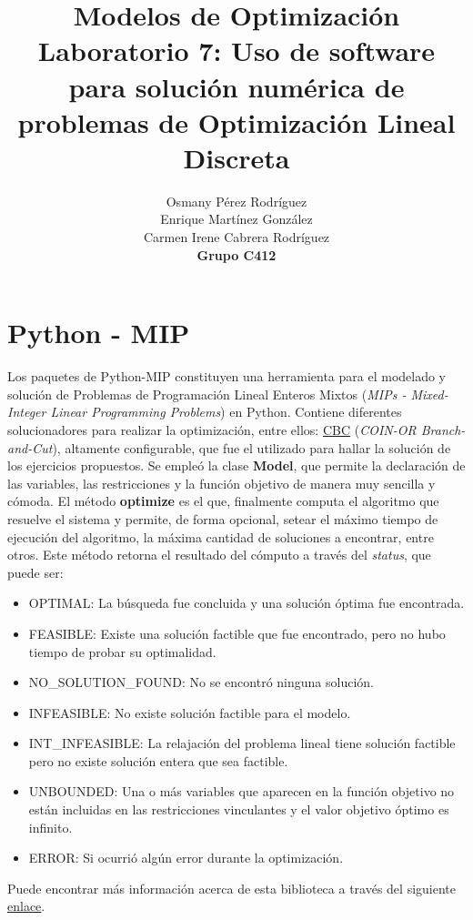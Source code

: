 \documentclass[titlepage, 11pt]{scrartcl}
\title{
    \normalfont\normalsize
    {\huge Modelos de Optimización\\
    		\textbf{Laboratorio 7:} Uso de software para solución numérica de problemas de 
    		Optimización Lineal Discreta}
    \vspace{12pt}
}
\author{Osmany P\'erez Rodr\'iguez\\
		Enrique Mart\'inez Gonz\'alez\\
		Carmen Irene Cabrera Rodr\'iguez\\
		\textbf{Grupo C412}}
\date{}
\begin{document}
    \maketitle 
    
    \section{Python - MIP}
    	Los paquetes de Python-MIP constituyen una herramienta para el modelado y solución de Problemas de Programación Lineal Enteros Mixtos (\textit{MIPs - Mixed-Integer Linear Programming Problems}) en Python. Contiene diferentes solucionadores para realizar la optimización, entre ellos: \href{https://github.com/coin-or/Cbc}{CBC} (\textit{COIN-OR Branch-and-Cut}), altamente configurable, que fue el utilizado para hallar la solución de los ejercicios propuestos.
		Se empleó la clase \textbf{Model}, que permite la declaración de las variables, las restricciones y la función objetivo de manera muy sencilla y cómoda. El método \textbf{optimize} es el que, finalmente computa el algoritmo que resuelve el sistema y permite, de forma opcional, setear el máximo tiempo de ejecución del algoritmo, la máxima cantidad de soluciones a encontrar, entre otros. Este método retorna el resultado del cómputo a través del \textit{status}, que puede ser:
		\begin{itemize}
			\item OPTIMAL: La búsqueda fue concluida y una solución óptima fue encontrada.
			\item FEASIBLE: Existe una solución factible que fue encontrado, pero no hubo tiempo de probar su optimalidad.
			\item NO\_SOLUTION\_FOUND: No se encontró ninguna solución.
			\item INFEASIBLE: No existe solución factible para el modelo.
			\item INT\_INFEASIBLE: La relajación del problema lineal tiene solución factible pero no existe solución entera que sea factible.
			\item UNBOUNDED: Una o más variables que aparecen en la función objetivo no están incluidas en las restricciones vinculantes y el valor objetivo óptimo es infinito.
			\item ERROR: Si ocurrió algún error durante la optimización.
		\end{itemize}
	
		Puede encontrar más información acerca de esta biblioteca a través del siguiente \href{https://docs.python-mip.com/en/latest/index.html}{enlace}.
		
\end{document}
